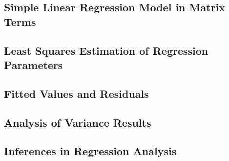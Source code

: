 \subsection{Simple Linear Regression Model in Matrix Terms}

\subsection{Least Squares Estimation of Regression Parameters}

\subsection{Fitted Values and Residuals}

\subsection{Analysis of Variance Results}

\subsection{Inferences in Regression Analysis}

